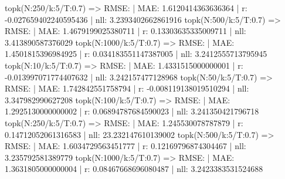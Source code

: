 topk(N:250/k:5/T:0.7) => RMSE: | MAE: 1.6120414363636364 | r: -0.027659402240595436 | nll: 3.2393402662861916
topk(N:500/k:5/T:0.7) => RMSE: | MAE: 1.4679199025380711 | r: 0.13303635335009711 | nll: 3.413890587376029
topk(N:1000/k:5/T:0.7) => RMSE: | MAE: 1.4501815396984925 | r: 0.034183551147387005 | nll: 3.2412555713795945
topk(N:10/k:5/T:0.7) => RMSE: | MAE: 1.4331515000000001 | r: -0.013997071774407632 | nll: 3.242157477128968
topk(N:50/k:5/T:0.7) => RMSE: | MAE: 1.742842551758794 | r: -0.008119138019510294 | nll: 3.347982990627208
topk(N:100/k:5/T:0.7) => RMSE: | MAE: 1.2925130000000002 | r: 0.06894787684590023 | nll: 3.241350421796718
topk(N:250/k:5/T:0.7) => RMSE: | MAE: 1.245530078787879 | r: 0.14712052061316583 | nll: 23.232147610139002
topk(N:500/k:5/T:0.7) => RMSE: | MAE: 1.6034729563451777 | r: 0.12169796874304467 | nll: 3.235792581389779
topk(N:1000/k:5/T:0.7) => RMSE: | MAE: 1.3631805000000004 | r: 0.08467668696080487 | nll: 3.2423383531524688
